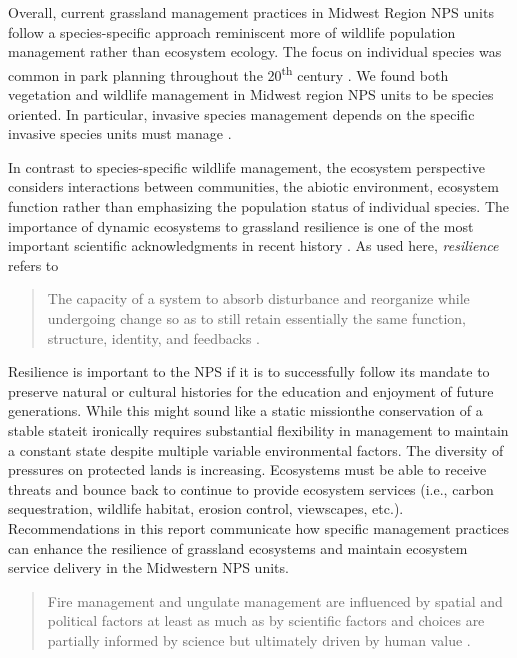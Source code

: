 Overall, current grassland management practices in Midwest Region NPS units follow a species-specific approach reminiscent more of wildlife population management rather than ecosystem ecology. 
The focus on individual species was common in park planning throughout the 20\textsuperscript{th} century \citep{lebel2006}. 
We found both vegetation and wildlife management in Midwest region NPS units to be species oriented. 
In particular, invasive species management depends on the specific invasive species units must manage \citep{bestelmeyer2012}. 

In contrast to species-specific wildlife management, the ecosystem perspective considers interactions between communities, the abiotic environment, ecosystem function rather than emphasizing the population status of individual species.
The importance of dynamic ecosystems to grassland resilience is one of the most important scientific acknowledgments in recent history \citep{thomas1996}.
As used here, \emph{resilience} refers to 
\begin{quote}
	The capacity of a system to absorb disturbance and reorganize while undergoing change so as to still retain essentially the same function, structure, identity, and feedbacks \citep{walker2004}. 
\end{quote}

Resilience is important to the NPS if it is to successfully follow its mandate to preserve natural or cultural histories for the education and enjoyment of future generations.
While this might sound like a static mission\textemdash the conservation of a stable state\textemdash it ironically requires substantial flexibility in management to maintain a constant state despite multiple variable environmental factors. 
The diversity of pressures on protected lands is increasing.
Ecosystems must be able to receive threats and bounce back to continue to provide ecosystem services (i.e., carbon sequestration, wildlife habitat, erosion control, viewscapes, etc.). 
Recommendations in this report communicate how specific management practices can enhance the resilience of grassland ecosystems and maintain ecosystem service delivery in the Midwestern NPS units. 

\begin{quote}
Fire management and ungulate management are influenced by spatial and political factors at least as much as by scientific factors and choices are partially informed by science but ultimately driven by human value \citep{cole2012}.
\end{quote}

